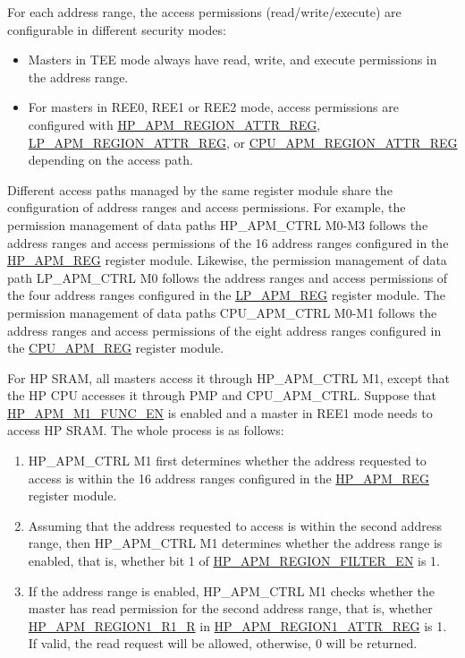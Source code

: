 \documentclass[main\_\_EN.tex]{subfiles}
\begin{document}
For each address range, the access permissions (read/write/execute) are configurable in different security modes:

\begin{itemize}

    \item Masters in TEE mode always have read, write, and execute permissions in the address range.

    \item For masters in REE0, REE1 or REE2 mode, access permissions are configured with \hyperref[regdesc:HPAPMREGIONNATTRREG]{HP\_APM\_REGION\_ATTR\_REG}, \hyperref[regdesc:LPAPMREGIONNATTRREG]{LP\_APM\_REGION\_ATTR\_REG}, or \hyperref[regdesc:CPUAPMREGIONNATTRREG]{CPU\_APM\_REGION\_ATTR\_REG} depending on the access path.

\end{itemize}

Different access paths managed by the same register module share the configuration of address ranges and access permissions. For example, the permission management of data paths HP\_APM\_CTRL M0-M3 follows the address ranges and access permissions of the 16 address ranges configured in the \hyperref[sec:permctrl-reg-hp]{HP\_APM\_REG} register module. Likewise, the permission management of data path LP\_APM\_CTRL M0 follows the address ranges and access permissions of the four address ranges configured in the \hyperref[sec:permctrl-reg-lp]{LP\_APM\_REG} register module. The permission management of data paths CPU\_APM\_CTRL M0-M1 follows the address ranges and access permissions of the eight address ranges configured in the \hyperref[sec:permctrl-reg-cpu]{CPU\_APM\_REG} register module.

For HP SRAM, all masters access it through HP\_APM\_CTRL M1, except that the HP CPU accesses it through PMP and CPU\_APM\_CTRL. Suppose that \hyperref[fielddesc:HPAPMM1FUNCEN]{HP\_APM\_M1\_FUNC\_EN} is enabled and a master in REE1 mode needs to access HP SRAM. The whole process is as follows:

\begin{enumerate}
    \item HP\_APM\_CTRL M1 first determines whether the address requested to access is within the 16 address ranges configured in the \hyperref[sec:permctrl-reg-hp]{HP\_APM\_REG} register module.

    \item Assuming that the address requested to access is within the second address range, then HP\_APM\_CTRL M1 determines whether the address range is enabled, that is, whether bit 1 of \hyperref[fielddesc:HPAPMREGIONFILTEREN]{HP\_APM\_REGION\_FILTER\_EN} is 1.

    \item If the address range is enabled, HP\_APM\_CTRL M1 checks whether the master has read permission for the second address range, that is, whether \hyperref[fielddesc:HPAPMREGIONNR1R]{HP\_APM\_REGION1\_R1\_R} in \hyperref[regdesc:HPAPMREGIONNATTRREG]{HP\_APM\_REGION1\_ATTR\_REG} is 1. If valid, the read request will be allowed, otherwise, 0 will be returned.

\end{enumerate}
\end{document}
